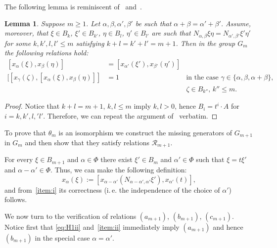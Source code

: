 \documentclass[oneside, 10pt]{amsart}
\newcommand{\RR}[1]{\mathcal{R}_{#1}}
\numberwithin{equation}{section}
\newtheorem{lemma}{Lemma}
\numberwithin{lemma}{section}
\theoremstyle{definition}
\theoremstyle{remark}
\begin{document}
The following lemma is reminiscent of~\cite[Proposition 1.1]{Re75} and~\cite[Proposition~3.2.2]{RS76}.
\begin{lemma}
 Suppose $m \geq 1$.
 Let $\alpha, \beta, \alpha', \beta'$ be such that $\alpha + \beta = \alpha' + \beta'$.
 Assume, moreover, that $\xi \in B_k$, $\xi' \in B_{k'}$, $\eta \in B_l$, $\eta' \in B_{l'}$ are such that 
  $N_{\alpha, \beta} \xi \eta = N_{\alpha', \beta'}\xi' \eta'$ for some $k,k',l,l'\leq m$ satisfying $k+l=k'+l' = m+1$.
 Then in the group $G_m$ the following relations hold:
 \begin{align}
  \label{item:i} [x_\alpha(\xi), x_\beta(\eta)] &= [x_{\alpha'}(\xi'), x_{\beta'}(\eta')] & \\
  \label{item:ii} [[x_\gamma(\zeta), [x_\alpha(\xi), x_\beta(\eta)]] & = 1 & \text{in the case } \gamma\in\{\alpha, \beta, \alpha + \beta\},\\
  \nonumber                                     &                          & \text{$\zeta \in B_{k''}$, $k''\leq m$.}
 \end{align}
\end{lemma}
\begin{proof}
 Notice that $k+l = m+1$, $k, l\leq m$ imply $k,l>0$, hence $B_i= t^i \cdot A$ for $i=k,k',l,'l'$.
 Therefore, we can repeat the argument of~\cite[Proposition 1.1]{Re75} verbatim.
\end{proof}

To prove that $\theta_m$ is an isomorphism we construct the missing generators of $G_{m+1}$ in $G_m$ and then show that they satisfy relations $\RR{m+1}$.

For every $\xi \in B_{m+1}$ and $\alpha\in \Phi$ there exist $\xi' \in B_m$ and $\alpha'\in \Phi$ such that $\xi = t\xi'$ and $\alpha-\alpha'\in\Phi$.
Thus, we can make the following definition:
\begin{equation} \label{eq:defmpn} x_\alpha(\xi) := [x_{\alpha-\alpha'}(N_{\alpha-\alpha',\alpha'} \xi'), x_{\alpha'}(t)],\end{equation} 
and from~\eqref{item:i} its correctness (i.\,e. the independence of the choice of $\alpha'$) follows.

We now turn to the verification of relations $(a_{m+1})$, $(b_{m+1})$, $(c_{m+1})$.
Notice first that \eqref{eq:H1ii} and~\eqref{item:ii} immediately imply $(a_{m+1})$ and hence $(b_{m+1})$ in the special case $\alpha=\alpha'$.
\end{document}
